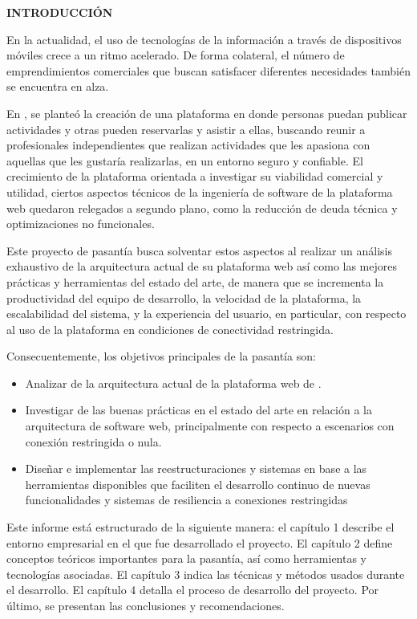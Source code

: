 
\begin{center}
\textsc{\bfseries\uppercase{Introducción}}
\end{center}

En la actualidad, el uso de tecnologías de la información a través de dispositivos móviles crece a un ritmo acelerado. De forma colateral, el número de emprendimientos comerciales que buscan satisfacer diferentes necesidades también se encuentra en alza.

En \business, se planteó la creación de una plataforma en donde personas puedan publicar actividades y otras pueden reservarlas y asistir a ellas, buscando reunir a profesionales independientes que realizan actividades que les apasiona con aquellas que les gustaría realizarlas, en un entorno seguro y confiable. El crecimiento de la plataforma orientada a investigar su viabilidad comercial y utilidad, ciertos aspectos técnicos de la ingeniería de software de la plataforma web quedaron relegados a segundo plano, como la reducción de deuda técnica y optimizaciones no funcionales.

Este proyecto de pasantía busca solventar estos aspectos al realizar un análisis exhaustivo de la arquitectura actual de su plataforma web así como las mejores prácticas y herramientas del estado del arte, de manera que se incrementa la productividad del equipo de desarrollo, la velocidad de la plataforma, la escalabilidad del sistema, y la experiencia del usuario, en particular, con respecto al uso de la plataforma en condiciones de conectividad restringida.

Consecuentemente, los objetivos principales de la pasantía son:

\begin{itemize}
  \item Analizar de la arquitectura actual de la plataforma web de \business.
  \item Investigar de las buenas prácticas en el estado del arte en relación a la arquitectura de software web, principalmente con respecto a escenarios con conexión restringida o nula.
  \item Diseñar e implementar las reestructuraciones y sistemas en base a las herramientas disponibles que faciliten el desarrollo continuo de nuevas funcionalidades y sistemas de resiliencia a conexiones restringidas
\end{itemize}

Este informe está estructurado de la siguiente manera: el capítulo 1 describe el entorno empresarial en el que fue desarrollado el proyecto. El capítulo 2 define conceptos teóricos importantes para la pasantía, así como herramientas y tecnologías asociadas. El capítulo 3 indica las técnicas y métodos usados durante el desarrollo. El capítulo 4 detalla el proceso de desarrollo del proyecto. Por último, se presentan las conclusiones y recomendaciones.

